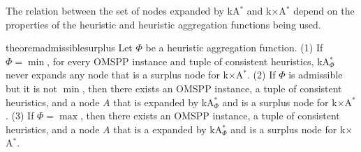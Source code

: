 \documentclass[smallextended]{svjour3}       %
\newcommand{\omspp}{\ac{OMSPP}\xspace}
\newcommand{\kastar}{kA$^*$\xspace}
\newcommand{\kastarvar}[1]{\textup{kA}$^*_{#1}$\xspace}
\newcommand{\kastarmin}{\kastarvar{\min}}
\newcommand{\kastarphi}{\textup{kA}$^*_{\Phi}$\xspace}
\newcommand{\kxastar}{k$\times$A$^*$\xspace}
\newcommand{\axiomadm}{admissible\xspace}
\newcommand{\vect}[1]{\mathbf{#1}}
\begin{document}

The relation between the set of nodes expanded by \kastar and \kxastar depend on the properties of the heuristic and heuristic aggregation functions being used.
\begin{restatable}{theorem}{admissiblesurplus}
  \label{the:kastarmin-surplus}
  Let $\Phi$ be a heuristic aggregation function. %
  (1) If $\Phi=\min$, for every \omspp instance and tuple of consistent heuristics, \kastarphi never expands any node that is a surplus node for \kxastar.
  (2) If $\Phi$ is \axiomadm but it is not $\min$, then there exists an \omspp instance, a tuple of consistent heuristics, and a node $A$ that is expanded by \kastarphi and is a surplus node for \kxastar.
  (3) If $\Phi=\max$, then there exists an \omspp instance, a tuple of consistent heuristics, and a node $A$ that is a expanded by \kastarphi and is a surplus node for \kxastar.
\end{restatable}
\end{document}
